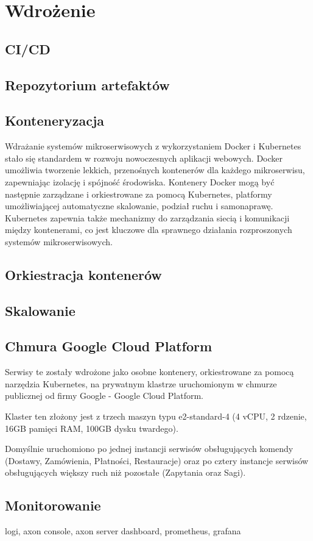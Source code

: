 \clearpage %

\section{Wdrożenie}

\subsection{CI/CD}

\subsection{Repozytorium artefaktów}

\subsection{Konteneryzacja}

Wdrażanie systemów mikroserwisowych z wykorzystaniem Docker i Kubernetes stało się standardem w rozwoju nowoczesnych aplikacji webowych. Docker umożliwia tworzenie lekkich, przenośnych kontenerów dla każdego mikroserwisu, zapewniając izolację i spójność środowiska. Kontenery Docker mogą być następnie zarządzane i orkiestrowane za pomocą Kubernetes, platformy umożliwiającej automatyczne skalowanie, podział ruchu  i samonaprawę. Kubernetes zapewnia także mechanizmy do zarządzania siecią i komunikacji między kontenerami, co jest kluczowe dla sprawnego działania rozproszonych systemów mikroserwisowych.

\subsection{Orkiestracja kontenerów}

\subsection{Skalowanie}

\subsection{Chmura Google Cloud Platform}

Serwisy te zostały wdrożone jako osobne kontenery, orkiestrowane za pomocą narzędzia Kubernetes, na prywatnym klastrze uruchomionym w chmurze publicznej od firmy Google - Google Cloud Platform.

Klaster ten złożony jest z trzech maszyn typu e2-standard-4 (4 vCPU, 2 rdzenie, 16GB pamięci RAM, 100GB dysku twardego).

Domyślnie uruchomiono po jednej instancji serwisów obsługujących komendy (Dostawy, Zamówienia, Płatności, Restauracje) oraz po cztery instancje serwisów obsługujących większy ruch niż pozostałe (Zapytania oraz Sagi).

\subsection{Monitorowanie}

logi, axon console, axon server dashboard, prometheus, grafana